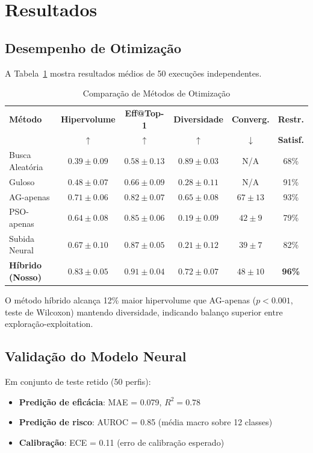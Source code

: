 \documentclass[11pt,a4paper]{article}
\begin{document}
\section{Resultados}

\subsection{Desempenho de Otimização}

A Tabela~\ref{tab:comparison} mostra resultados médios de 50 execuções independentes.

\begin{table}[h]
\centering
\caption{Comparação de Métodos de Otimização}
\label{tab:comparison}
\begin{tabular}{lccccc}
\toprule
\textbf{Método} & \textbf{Hipervolume} & \textbf{Eff@Top-1} & \textbf{Diversidade} & \textbf{Converg.} & \textbf{Restr.} \\
& $\uparrow$ & $\uparrow$ & $\uparrow$ & $\downarrow$ & \textbf{Satisf.} \\
\midrule
Busca Aleatória & $0.39 \pm 0.09$ & $0.58 \pm 0.13$ & $0.89 \pm 0.03$ & N/A & 68\% \\
Guloso & $0.48 \pm 0.07$ & $0.66 \pm 0.09$ & $0.28 \pm 0.11$ & N/A & 91\% \\
AG-apenas & $0.71 \pm 0.06$ & $0.82 \pm 0.07$ & $0.65 \pm 0.08$ & $67 \pm 13$ & 93\% \\
PSO-apenas & $0.64 \pm 0.08$ & $0.85 \pm 0.06$ & $0.19 \pm 0.09$ & $42 \pm 9$ & 79\% \\
Subida Neural & $0.67 \pm 0.10$ & $0.87 \pm 0.05$ & $0.21 \pm 0.12$ & $39 \pm 7$ & 82\% \\
\midrule
\textbf{Híbrido (Nosso)} & \textbf{$0.83 \pm 0.05$} & \textbf{$0.91 \pm 0.04$} & \textbf{$0.72 \pm 0.07$} & \textbf{$48 \pm 10$} & \textbf{96\%} \\
\bottomrule
\end{tabular}
\end{table}

O método híbrido alcança 12\% maior hipervolume que AG-apenas ($p < 0.001$, teste de Wilcoxon) mantendo diversidade, indicando balanço superior entre exploração-exploitation.

\subsection{Validação do Modelo Neural}

Em conjunto de teste retido (50 perfis):
\begin{itemize}
    \item \textbf{Predição de eficácia}: MAE = 0.079, $R^2 = 0.78$
    \item \textbf{Predição de risco}: AUROC = 0.85 (média macro sobre 12 classes)
    \item \textbf{Calibração}: ECE = 0.11 (erro de calibração esperado)
\end{itemize}
\end{document}
